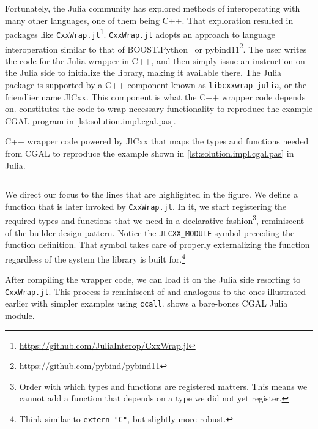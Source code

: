 Fortunately, the Julia community has explored methods of interoperating with
many other languages, one of them being C++.  That exploration resulted in
packages like 
\texttt{CxxWrap.jl}\footnote{\url{https://github.com/JuliaInterop/CxxWrap.jl}}.
\texttt{CxxWrap.jl} adopts an approach to language interoperation similar to
that of BOOST.Python~\cite{Abrahams:2003:BHSBP} or
pybind11\footnote{\url{https://github.com/pybind/pybind11}}.  The user writes
the code for the Julia wrapper in C++, and then simply issue an instruction on
the Julia side to initialize the library, making it available there.  The Julia
package is supported by a C++ component known as \texttt{libcxxwrap-julia}, or
the friendlier name JlCxx. This component is what the C++ wrapper code depends
on.   constitutes the code to wrap
necessary functionality to reproduce the example \ac{CGAL} program in
\cref{lst:solution.impl.cgal.pas}.

\begin{listing}[htbp]
  \caption[Wrapper CxxWrap code for Three points and one segment]{
    C++ wrapper code powered by JlCxx that maps the types and functions needed
    from \acs{CGAL} to reproduce the example shown in
    \cref{lst:solution.impl.cgal.pas} in Julia.}%
  \label{lst:solution.impl.jlcgal.jlcxx}
  \vspace{-8pt}
  \inputminted[highlightlines={24,30-34,36-38,40-43,46-49}]%
    {cpp}{cpp/cgal_julia.cpp}
\end{listing}

We direct our focus to the lines that are highlighted in the figure.  We define
a function that is later invoked by \texttt{CxxWrap.jl}.  In it, we start
registering the required types and functions that we need in a declarative
fashion\footnote{Order with which types and functions are registered matters.
This means we cannot add a function that depends on a type we did not yet
register.}, reminiscent of the builder design pattern.  Notice the
\texttt{JLCXX\_MODULE} symbol preceding the function definition.  That symbol
takes care of properly externalizing the function regardless of the system the
library is built for.\footnote{Think similar to \texttt{extern "C"}, but
slightly more robust.}

After compiling the wrapper code, we can load it on the Julia side resorting to
\texttt{CxxWrap.jl}.  This process is reminiscent of and analogous to the ones
illustrated earlier with simpler examples using \texttt{ccall}.
 shows a bare-bones CGAL Julia module.


